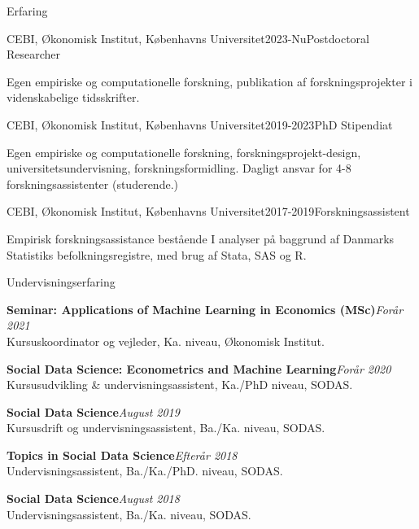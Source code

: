 \documentclass[
	11pt, %
]{resume} %
\begin{document}
\begin{rSection}{Erfaring}
    \begin{rSubsection}{CEBI, Økonomisk Institut, Københavns Universitet}{2023-Nu}{Postdoctoral Researcher}{}
        \item[] Egen empiriske og computationelle forskning, publikation af forskningsprojekter i videnskabelige tidsskrifter.
    \end{rSubsection}

    \begin{rSubsection}{CEBI, Økonomisk Institut, Københavns Universitet}{2019-2023}{PhD Stipendiat}{}
        \item[] Egen empiriske og computationelle forskning, forskningsprojekt-design, universitetsundervisning, forskningsformidling. Dagligt ansvar for 4-8 forskningsassistenter (studerende.)
    \end{rSubsection}

    \begin{rSubsection}{CEBI, Økonomisk Institut, Københavns Universitet}{2017-2019}{Forskningsassistent}{}
        \item[] Empirisk forskningsassistance bestående I analyser på baggrund af Danmarks Statistiks befolkningsregistre, med brug af Stata, SAS og R.
    \end{rSubsection}


\end{rSection}

\begin{rSection}{Undervisningserfaring}

    \textbf{Seminar: Applications of Machine Learning in Economics (MSc)}\hfill \textit{Forår 2021} \\
    Kursuskoordinator og vejleder, Ka. niveau, Økonomisk Institut.

    \textbf{Social Data Science: Econometrics and Machine Learning}\hfill \textit{Forår 2020} \\
    Kursusudvikling \& undervisningsassistent, Ka./PhD niveau, SODAS.

    \textbf{Social Data Science}\hfill \textit{August 2019} \\
    Kursusdrift og undervisningsassistent, Ba./Ka. niveau, SODAS.

    \textbf{Topics in Social Data Science}\hfill \textit{Efterår 2018} \\
    Undervisningsassistent, Ba./Ka./PhD. niveau, SODAS.

    \textbf{Social Data Science}\hfill \textit{August 2018} \\
    Undervisningsassistent, Ba./Ka. niveau, SODAS.
\end{rSection}
\end{document}
